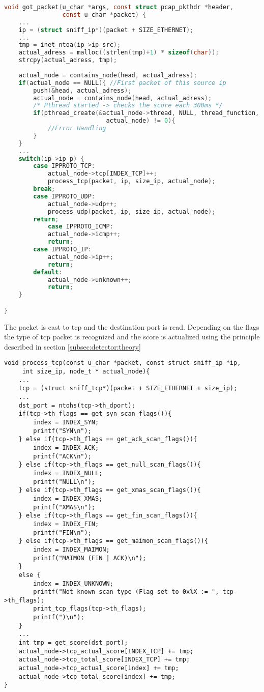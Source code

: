 \begin{lstlisting}[frame=single, language=C, caption=The \lstinline|got_packet| function.]
void got_packet(u_char *args, const struct pcap_pkthdr *header, 
				const u_char *packet) {
	...
	ip = (struct sniff_ip*)(packet + SIZE_ETHERNET);
	...
	tmp = inet_ntoa(ip->ip_src);
	actual_adress = malloc((strlen(tmp)+1) * sizeof(char));
	strcpy(actual_adress, tmp);
	
	actual_node = contains_node(head, actual_adress);
	if(actual_node == NULL){ //First packet of this source ip
		push(&head, actual_adress);
		actual_node = contains_node(head, actual_adress);
		/* Pthread started -> checks the score each 300ms */
		if(pthread_create(&actual_node->thread, NULL, thread_function, 
							actual_node) != 0){
			//Error Handling
		}	
	}
	...
	switch(ip->ip_p) {
		case IPPROTO_TCP:
			actual_node->tcp[INDEX_TCP]++;
			process_tcp(packet, ip, size_ip, actual_node);
		break;
		case IPPROTO_UDP:
			actual_node->udp++;
			process_udp(packet, ip, size_ip, actual_node);
		return;
			case IPPROTO_ICMP:
			actual_node->icmp++;
			return;
		case IPPROTO_IP:
			actual_node->ip++;
			return;
		default:
			actual_node->unknown++;
			return;
	} 

}
\end{lstlisting}
The packet is cast to tcp and the destination port is read. Depending on the flags
the type of tcp packet is recognized and the score is actualized using the principle described in
section \ref{subsec:detector:theory}
\begin{lstlisting}[frame=single]
void process_tcp(const u_char *packet, const struct sniff_ip *ip,
	 int size_ip, node_t * actual_node){
	...
	tcp = (struct sniff_tcp*)(packet + SIZE_ETHERNET + size_ip);
	...
	dst_port = ntohs(tcp->th_dport);
	if(tcp->th_flags == get_syn_scan_flags()){
		index = INDEX_SYN;
		printf("SYN\n");
	} else if(tcp->th_flags == get_ack_scan_flags()){
		index = INDEX_ACK;
		printf("ACK\n");
	} else if(tcp->th_flags == get_null_scan_flags()){
		index = INDEX_NULL;
		printf("NULL\n");
	} else if(tcp->th_flags == get_xmas_scan_flags()){
		index = INDEX_XMAS;
		printf("XMAS\n");
	} else if(tcp->th_flags == get_fin_scan_flags()){
		index = INDEX_FIN;
		printf("FIN\n");
	} else if(tcp->th_flags == get_maimon_scan_flags()){
		index = INDEX_MAIMON;
		printf("MAIMON (FIN | ACK)\n");
	}
	else {
		index = INDEX_UNKNOWN;
		printf("Not known scan type (Flag set to 0x%X := ", tcp->th_flags);
		print_tcp_flags(tcp->th_flags);
		printf(")\n");
	}
	...
	int tmp = get_score(dst_port);
	actual_node->tcp_actual_score[INDEX_TCP] += tmp;
	actual_node->tcp_total_score[INDEX_TCP] += tmp;
	actual_node->tcp_actual_score[index] += tmp;
	actual_node->tcp_total_score[index] += tmp;
}
\end{lstlisting}

